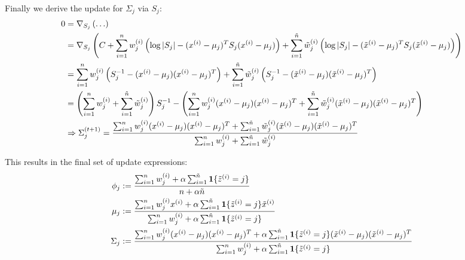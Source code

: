\begin{answer}
Finally we derive the update for $\Sigma_j$ via $S_j$:
\begin{align*}
0 &= \nabla_{S_j} \left(\ldots\right) \\
&= \nabla_{S_j} \left(C + \sum_{i=1}^{n} w^{(i)}_j\left(\log |S_j| - (x^{(i)}-\mu_j)^TS_j(x^{(i)}-\mu_j)\right) + \sum_{i=1}^{\tilde{{n}}} \tilde{w}^{(i)}_j\left(\log |S_j| - (\tilde{x}^{(i)}-\mu_j)^TS_j(\tilde{x}^{(i)}-\mu_j)\right)\right) \\
&= \sum_{i=1}^{n} w^{(i)}_j\left(S_j^{-1} - (x^{(i)}-\mu_j)(x^{(i)}-\mu_j)^T\right) + \sum_{i=1}^{\tilde{{n}}} \tilde{w}^{(i)}_j\left(S_j^{-1} - (\tilde{x}^{(i)}-\mu_j)(\tilde{x}^{(i)}-\mu_j)^T\right) \\
&= \left(\sum_{i=1}^{n} w^{(i)}_j + \sum_{i=1}^{\tilde{{n}}} \tilde{w}^{(i)}_j\right) S_j^{-1} - \left(\sum_{i=1}^{n} w_{j}^{(i)}(x^{(i)}-\mu_j)(x^{(i)}-\mu_j)^T + \sum_{i=1}^{\tilde{{n}}} \tilde{w}^{(i)}_j(\tilde{x}^{(i)} - \mu_j)(\tilde{x}^{(i)}-\mu_j)^T\right) \\
&\Rightarrow \Sigma_j^{(t+1)} = \frac{\sum_{i=1}^{n} w_{j}^{(i)}(x^{(i)}-\mu_j)(x^{(i)}-\mu_j)^T + \sum_{i=1}^{\tilde{{n}}} \tilde{w}^{(i)}_j(\tilde{x}^{(i)} - \mu_j)(\tilde{x}^{(i)}-\mu_j)^T}{\sum_{i=1}^{n} w^{(i)}_j + \sum_{i=1}^{\tilde{{n}}} \tilde{w}^{(i)}_j}
\end{align*}

This results in the final set of update expressions:
\begin{align*}
  \phi_j & := \frac{ \sum_{i=1}^{n} w^{(i)}_j + \alpha \sum_{i=1}^{\tilde{{n}}}\textbf{1}\{\tilde{z}^{(i)} = j\}}{{n} + \alpha \tilde{{n}}} \\
  \mu_j & := \frac{ \sum_{i=1}^{n} w^{(i)}_jx^{(i)} + \alpha\sum_{i=1}^{\tilde{{n}}} \textbf{1}\{\tilde{z}^{(i)} = j\}\tilde{x}^{(i)}} {\sum_{i=1}^{n} w^{(i)}_j + \alpha\sum_{i=1}^{\tilde{{n}}} \textbf{1}\{\tilde{z}^{(i)} = j\} } \\
  \Sigma_j & := \frac{ \sum_{i=1}^{n} w^{(i)}_j(x^{(i)}-\mu_j)(x^{(i)}-\mu_j)^T + \alpha\sum_{i=1}^{\tilde{{n}}} \textbf{1}\{\tilde{z}^{(i)} = j\}(\tilde{x}^{(i)}-\mu_j)(\tilde{x}^{(i)}-\mu_j)^T} {\sum_{i=1}^{n} w^{(i)}_j + \alpha\sum_{i=1}^{\tilde{{n}}} \textbf{1}\{\tilde{z}^{(i)} = j\} }
\end{align*}
\end{answer}
